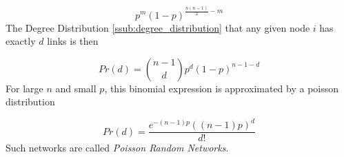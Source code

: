 \begin{equation}
\label{eq:erdoesrenyiprob}
	p^m (1 - p)^{\frac{n(n-1)}{2}-m}
\end{equation}
The Degree Distribution \ref{ssub:degree_distribution}
that any given node $i$ has exactly $d$ links is then

\begin{equation}
\label{eq:erdoesrenyidegreedist}
	Pr(d) = \binom{n-1}{d} p^d(1-p)^{n-1-d}
\end{equation}
For large $n$ and small $p$,
this binomial expression is approximated by a poisson distribution

\begin{equation}
\label{eq:erdoesrenyipoisson}
	Pr(d) = \frac{e^{-(n-1)p}((n-1)p)^d}{d!}
\end{equation}
Such networks are called \emph{Poisson Random Networks}.


